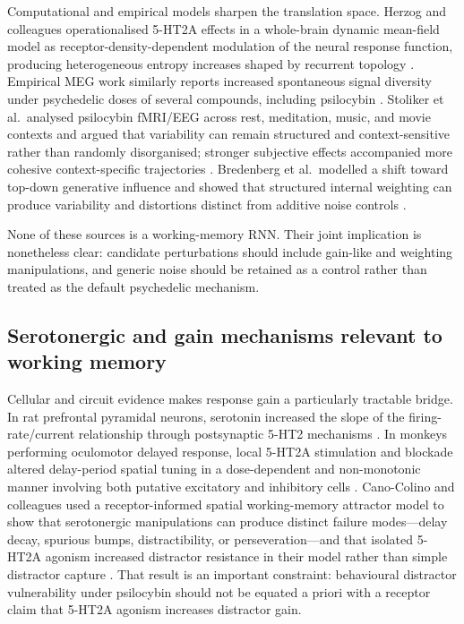 Computational and empirical models sharpen the translation space. Herzog and
colleagues operationalised 5-HT2A effects in a whole-brain dynamic mean-field
model as receptor-density-dependent modulation of the neural response function,
producing heterogeneous entropy increases shaped by recurrent topology
\cite{herzog2023}. Empirical MEG work similarly reports increased spontaneous
signal diversity under psychedelic doses of several compounds, including
psilocybin \cite{schartner2017}. Stoliker et al.\ analysed psilocybin fMRI/EEG
across rest, meditation, music, and movie contexts and argued that variability
can remain structured and context-sensitive rather than randomly
disorganised; stronger subjective effects accompanied more cohesive
context-specific trajectories \cite{stoliker2026}. Bredenberg et al.\ modelled
a shift toward top-down generative influence and showed that structured
internal weighting can produce variability and distortions distinct from
additive noise controls \cite{bredenberg2026}.

None of these sources is a working-memory RNN. Their joint implication is
nonetheless clear: candidate perturbations should include gain-like and
weighting manipulations, and generic noise should be retained as a control
rather than treated as the default psychedelic mechanism.

\subsection{Serotonergic and gain mechanisms relevant to working memory}

Cellular and circuit evidence makes response gain a particularly tractable
bridge. In rat prefrontal pyramidal neurons, serotonin increased the slope of
the firing-rate/current relationship through postsynaptic 5-HT2 mechanisms
\cite{zhang2005gain}. In monkeys performing oculomotor delayed response, local
5-HT2A stimulation and blockade altered delay-period spatial tuning in a
dose-dependent and non-monotonic manner involving both putative excitatory and
inhibitory cells \cite{williams2002ht2a}. Cano-Colino and colleagues used a
receptor-informed spatial working-memory attractor model to show that
serotonergic manipulations can produce distinct failure modes---delay decay,
spurious bumps, distractibility, or perseveration---and that isolated 5-HT2A
agonism increased distractor resistance in their model rather than simple
distractor capture \cite{canocolino2013}. That result is an important
constraint: behavioural distractor vulnerability under psilocybin should not be
equated a priori with a receptor claim that 5-HT2A agonism increases distractor
gain.

